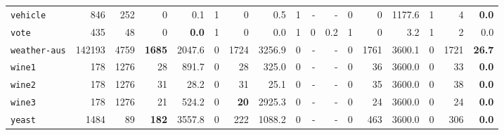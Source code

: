 \begin{tabular}{lccrrrrrrrrrrrrrr}
\texttt{vehicle} & \multicolumn{1}{r}{846} & \multicolumn{1}{r}{252}  & 0 & 0.1 & 1 & 0 & 0.5 & 1 & - & - & 0 & 0 & 1177.6 & 1 & 4 & \textbf{0.0}\\
\texttt{vote} & \multicolumn{1}{r}{435} & \multicolumn{1}{r}{48}  & 0 & \textbf{0.0} & 1 & 0 & 0.0 & 1 & 0 & 0.2 & 1 & 0 & 3.2 & 1 & 2 & 0.0\\
\texttt{weather-aus} & \multicolumn{1}{r}{142193} & \multicolumn{1}{r}{4759}  & \textbf{1685} & 2047.6 & 0 & 1724 & 3256.9 & 0 & - & - & 0 & 1761 & 3600.1 & 0 & 1721 & \textbf{26.7}\\
\texttt{wine1} & \multicolumn{1}{r}{178} & \multicolumn{1}{r}{1276}  & 28 & 891.7 & 0 & 28 & 325.0 & 0 & - & - & 0 & 36 & 3600.0 & 0 & 33 & \textbf{0.0}\\
\texttt{wine2} & \multicolumn{1}{r}{178} & \multicolumn{1}{r}{1276}  & 31 & 28.2 & 0 & 31 & 25.1 & 0 & - & - & 0 & 35 & 3600.0 & 0 & 38 & \textbf{0.0}\\
\texttt{wine3} & \multicolumn{1}{r}{178} & \multicolumn{1}{r}{1276}  & 21 & 524.2 & 0 & \textbf{20} & 2925.3 & 0 & - & - & 0 & 24 & 3600.0 & 0 & 24 & \textbf{0.0}\\
\texttt{yeast} & \multicolumn{1}{r}{1484} & \multicolumn{1}{r}{89}  & \textbf{182} & 3557.8 & 0 & 222 & 1088.2 & 0 & - & - & 0 & 463 & 3600.0 & 0 & 306 & \textbf{0.0}\\
\bottomrule
\end{tabular}
